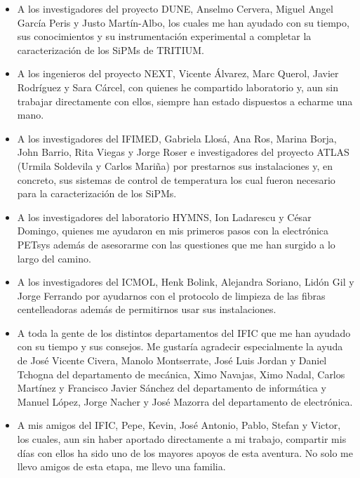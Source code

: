 \begin{itemize}

\item{} A los investigadores del proyecto DUNE, Anselmo Cervera, Miguel Angel García Peris y Justo Martín-Albo, los cuales me han ayudado con su tiempo, sus conocimientos y su instrumentación experimental a completar la caracterización de los SiPMs de TRITIUM. 

\item{} A los ingenieros del proyecto NEXT, Vicente Álvarez, Marc Querol, Javier Rodríguez y Sara Cárcel, con quienes he compartido laboratorio y, aun sin trabajar directamente con ellos, siempre han estado dispuestos a echarme una mano. 

\item{} A los investigadores del IFIMED, Gabriela Llosá, Ana Ros, Marina Borja, John Barrio, Rita Viegas y Jorge Roser e investigadores del proyecto ATLAS (Urmila Soldevila y Carlos Mariña) por prestarnos sus instalaciones y, en concreto, sus sistemas de control de temperatura los cual fueron necesario para la caracterización de los SiPMs. 

\item{} A los investigadores del laboratorio HYMNS, Ion Ladarescu y César Domingo, quienes me ayudaron en mis primeros pasos con la electrónica PETsys además de asesorarme con las questiones que me han surgido a lo largo del camino.

\item{} A los investigadores del ICMOL, Henk Bolink, Alejandra Soriano, Lidón Gil y Jorge Ferrando por ayudarnos con el protocolo de limpieza de las fibras centelleadoras además de permitirnos usar sus instalaciones.

\item{} A toda la gente de los distintos departamentos del IFIC que me han ayudado con su tiempo y sus consejos. Me gustaría agradecir especialmente la ayuda de José Vicente Civera, Manolo Montserrate, José Luis Jordan y Daniel Tchogna del departamento de mecánica, Ximo Navajas, Ximo Nadal, Carlos Martínez y Francisco Javier Sánchez del departamento de informática y Manuel López, Jorge Nacher y José Mazorra del departamento de electrónica.

\item{} A mis amigos del IFIC, Pepe, Kevin, José Antonio, Pablo, Stefan y Victor, los cuales, aun sin haber aportado directamente a mi trabajo, compartir mis días con ellos ha sido uno de los mayores apoyos de esta aventura. No solo me llevo amigos de esta etapa, me llevo una familia.


\end{itemize}
